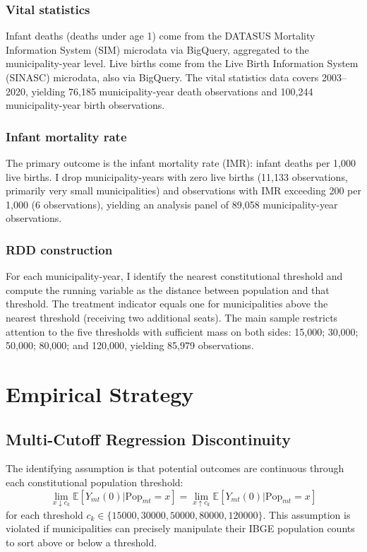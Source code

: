 \documentclass[12pt]{article}
\newcommand{\E}{\mathbb{E}}
\begin{document}
\subsubsection*{Vital statistics} Infant deaths (deaths under age 1) come from the DATASUS Mortality Information System (SIM) microdata via BigQuery, aggregated to the municipality-year level. Live births come from the Live Birth Information System (SINASC) microdata, also via BigQuery. The vital statistics data covers 2003--2020, yielding 76,185 municipality-year death observations and 100,244 municipality-year birth observations.

\subsubsection*{Infant mortality rate} The primary outcome is the infant mortality rate (IMR): infant deaths per 1,000 live births. I drop municipality-years with zero live births (11,133 observations, primarily very small municipalities) and observations with IMR exceeding 200 per 1,000 (6 observations), yielding an analysis panel of 89,058 municipality-year observations.

\subsubsection*{RDD construction} For each municipality-year, I identify the nearest constitutional threshold and compute the running variable as the distance between population and that threshold. The treatment indicator equals one for municipalities above the nearest threshold (receiving two additional seats). The main sample restricts attention to the five thresholds with sufficient mass on both sides: 15,000; 30,000; 50,000; 80,000; and 120,000, yielding 85,979 observations.




\section{Empirical Strategy}

\subsection{Multi-Cutoff Regression Discontinuity}

The identifying assumption is that potential outcomes are continuous through each constitutional population threshold:
\begin{equation}
\lim_{x \downarrow c_k} \E[Y_{mt}(0) | \text{Pop}_{mt} = x] = \lim_{x \uparrow c_k} \E[Y_{mt}(0) | \text{Pop}_{mt} = x]
\end{equation}
for each threshold $c_k \in \{15000, 30000, 50000, 80000, 120000\}$. This assumption is violated if municipalities can precisely manipulate their IBGE population counts to sort above or below a threshold.
\end{document}
